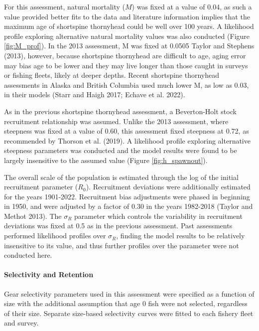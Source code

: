 \documentclass[11pt,
  english,
  letterpaper,
]{article}
\begin{document}
For this assessment, natural mortality (\(M\)) was fixed at a value of 0.04, as such a value provided better fits to the data and literature information implies that the maximum age of shortspine thornyhead could be well over 100 years. A likelihood profile exploring alternative natural mortality values was also conducted (Figure \ref{fig:M_prof}). In the 2013 assessment, M was fixed at 0.0505 Taylor and Stephens (2013), however, because shortspine thornyhead are difficult to age, aging error may bias age to be lower and they may live longer than those caught in surveys or fishing fleets, likely at deeper depths. Recent shortspine thornyhead assessments in Alaska and British Columbia used much lower M, as low as 0.03, in their models (Starr and Haigh 2017; Echave et al. 2022).

As in the previous shortspine thornyhead assessment, a Beverton-Holt stock recruitment relationship was assumed. Unlike the 2013 assessment, where steepness was fixed at a value of 0.60, this assessment fixed steepness at 0.72, as recommended by Thorson et al. (2019). A likelihood profile exploring alternative steepness parameters was conducted and the model results were found to be largely insensitive to the assumed value (Figure \ref{fig:h_spawnout}).

The overall scale of the population is estimated through the log of the initial recruitment parameter (\(R_0\)). Recruitment deviations were additionally estimated for the years 1901-2022. Recruitment bias adjustments were phased in beginning in 1950, and were adjusted by a factor of 0.30 in the years 1982-2018 (Taylor and Methot 2013). The \(\sigma_R\) parameter which controls the variability in recruitment deviations was fixed at 0.5 as in the previous assessment. Past assessments performed likelihood profiles over \(\sigma_R\), finding the model results to be relatively insensitive to its value, and thus further profiles over the parameter were not conducted here.

\hypertarget{selectivity-and-retention}{%
\paragraph{Selectivity and Retention}\label{selectivity-and-retention}}

Gear selectivity parameters used in this assessment were specified as a function of size with the additional assumption that age 0 fish were not selected, regardless of their size. Separate size-based selectivity curves were fitted to each fishery fleet and survey.
\end{document}
